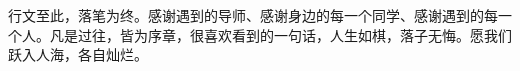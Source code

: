 \documentclass[
    type = bachelor,
    decl-page,  %
    oneside,                %
  ]{njuthesis}
\begin{document}
\tableofcontents

\mainmatter








\printbibliography


\begin{acknowledgement}
  行文至此，落笔为终。感谢遇到的导师、感谢身边的每一个同学、感谢遇到的每一个人。凡是过往，皆为序章，很喜欢看到的一句话，人生如棋，落子无悔。愿我们跃入人海，各自灿烂。
\end{acknowledgement}




\appendix

\end{document}
